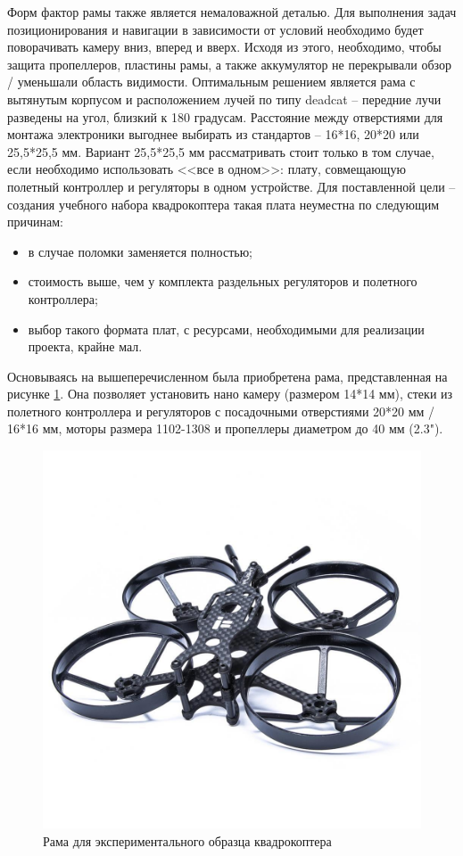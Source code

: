 Форм фактор рамы также является немаловажной деталью. Для выполнения задач позиционирования и навигации в зависимости от условий необходимо будет поворачивать камеру вниз, вперед и вверх. Исходя из этого, необходимо, чтобы защита пропеллеров, пластины рамы, а также аккумулятор не перекрывали обзор / уменьшали область видимости. Оптимальным решением является рама с вытянутым корпусом и расположением лучей по типу deadcat -- передние лучи разведены на угол, близкий к 180 градусам. Расстояние между отверстиями для монтажа электроники выгоднее выбирать из стандартов -- 16*16, 20*20 или 25,5*25,5 мм. Вариант 25,5*25,5 мм рассматривать стоит только в том случае, если необходимо использовать <<все в одном>>: плату, совмещающую полетный контроллер и регуляторы в одном устройстве. Для поставленной цели -- создания учебного набора квадрокоптера такая плата неуместна по следующим причинам:
\begin{itemize}
	\item в случае поломки заменяется полностью;
	\item стоимость выше, чем у комплекта раздельных регуляторов и полетного контроллера;
	\item выбор такого формата плат, с ресурсами, необходимыми для реализации проекта, крайне мал.
\end{itemize}

Основываясь на вышеперечисленном была приобретена рама, представленная на рисунке \ref{fig:frame}. Она позволяет установить нано камеру (размером 14*14 мм), стеки из полетного контроллера и регуляторов с посадочными отверстиями 20*20 мм / 16*16 мм, моторы размера 1102-1308 и пропеллеры диаметром до 40 мм (2.3").

\begin{figure}[H]
	\centering
	\includegraphics[width=0.5\linewidth]{../RW/pics/frame}
	\caption{Рама для экспериментального образца квадрокоптера
	}
	\label{fig:frame}
\end{figure}

